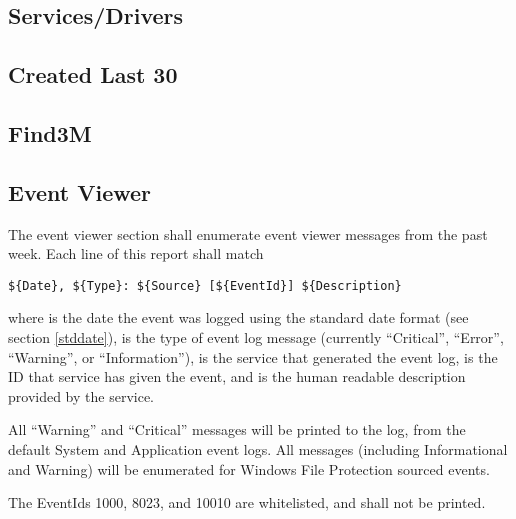 \subsection{Services/Drivers}
\subsection{Created Last 30}
\subsection{Find3M}
\subsection{Event Viewer}
The event viewer section shall enumerate event viewer messages from the past
week. Each line of this report shall match
\begin{verbatim}
${Date}, ${Type}: ${Source} [${EventId}] ${Description}
\end{verbatim}
where  is the date the event was logged using the standard date format
(see section \ref{stddate}),  is the type of event log message
(currently ``Critical'', ``Error'', ``Warning'', or ``Information''),
 is the service that generated the event log,  is the
ID that service has given the event, and  is the human readable
description provided by the service.

All ``Warning'' and ``Critical'' messages will be printed to the log, from the
default System and Application event logs. All messages (including
Informational and Warning) will be enumerated for Windows File Protection
sourced events.

The EventIds 1000, 8023, and 10010 are whitelisted, and shall not be printed.

